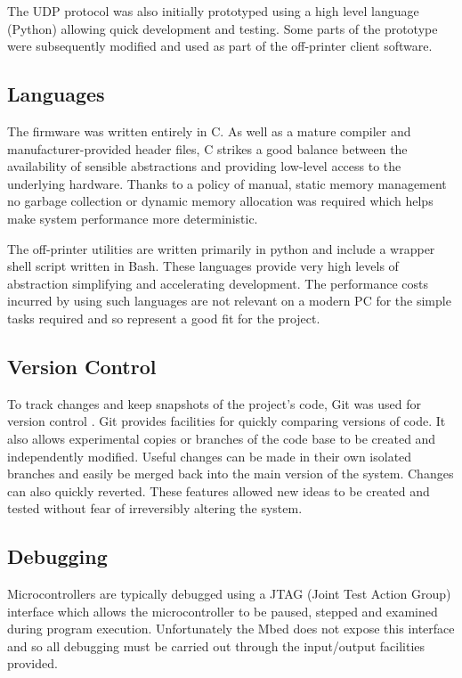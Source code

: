 			The UDP protocol was also initially prototyped using a high level language
			(Python) allowing quick development and testing. Some parts of the
			prototype were subsequently modified and used as part of the off-printer
			client software.
		
		
		\subsection{Languages}
			
			The firmware was written entirely in C. As well as a mature compiler and
			manufacturer-provided header files, C strikes a good balance between the
			availability of sensible abstractions and providing low-level access to
			the underlying hardware. Thanks to a policy of manual, static memory
			management no garbage collection or dynamic memory allocation was required
			which helps make system performance more deterministic.
			
			The off-printer utilities are written primarily in python and include a
			wrapper shell script written in Bash. These languages provide very high
			levels of abstraction simplifying and accelerating development. The
			performance costs incurred by using such languages are not relevant on a
			modern PC for the simple tasks required and so represent a good fit for
			the project.
			
		\subsection{Version Control}
			
			To track changes and keep snapshots of the project's code, Git was used
			for version control \cite{git}. Git provides facilities for quickly
			comparing versions of code. It also allows experimental copies or branches
			of the code base to be created and independently modified. Useful changes
			can be made in their own isolated branches and easily be merged back into
			the main version of the system. Changes can also quickly reverted. These
			features allowed new ideas to be created and tested without fear of
			irreversibly altering the system.
		
		\subsection{Debugging}
			
			Microcontrollers are typically debugged using a JTAG (Joint Test Action
			Group) interface which allows the microcontroller to be paused, stepped
			and examined during program execution. Unfortunately the Mbed does not
			expose this interface and so all debugging must be carried out through the
			input/output facilities provided.
			
